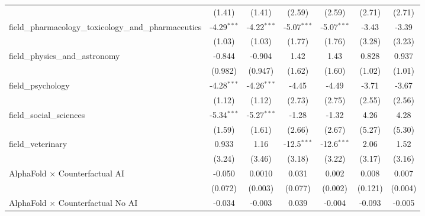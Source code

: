 \begin{tabular}{lcccccc}
                                                               & (1.41)        & (1.41)        & (2.59)        & (2.59)        & (2.71)        & (2.71)\\   
   field\_pharmacology\_toxicology\_and\_pharmaceutics         & -4.29$^{***}$ & -4.22$^{***}$ & -5.07$^{***}$ & -5.07$^{***}$ & -3.43         & -3.39\\   
                                                               & (1.03)        & (1.03)        & (1.77)        & (1.76)        & (3.28)        & (3.23)\\   
   field\_physics\_and\_astronomy                              & -0.844        & -0.904        & 1.42          & 1.43          & 0.828         & 0.937\\   
                                                               & (0.982)       & (0.947)       & (1.62)        & (1.60)        & (1.02)        & (1.01)\\   
   field\_psychology                                           & -4.28$^{***}$ & -4.26$^{***}$ & -4.45         & -4.49         & -3.71         & -3.67\\   
                                                               & (1.12)        & (1.12)        & (2.73)        & (2.75)        & (2.55)        & (2.56)\\   
   field\_social\_sciences                                     & -5.34$^{***}$ & -5.27$^{***}$ & -1.28         & -1.32         & 4.26          & 4.28\\   
                                                               & (1.59)        & (1.61)        & (2.66)        & (2.67)        & (5.27)        & (5.30)\\   
   field\_veterinary                                           & 0.933         & 1.16          & -12.5$^{***}$ & -12.6$^{***}$ & 2.06          & 1.52\\   
                                                               & (3.24)        & (3.46)        & (3.18)        & (3.22)        & (3.17)        & (3.16)\\   
   AlphaFold $\times$ Counterfactual AI                        & -0.050        & 0.0010        & 0.031         & 0.002         & 0.008         & 0.007\\   
                                                               & (0.072)       & (0.003)       & (0.077)       & (0.002)       & (0.121)       & (0.004)\\   
   AlphaFold $\times$ Counterfactual No AI                     & -0.034        & -0.003        & 0.039         & -0.004        & -0.093        & -0.005\\   

\end{tabular}
